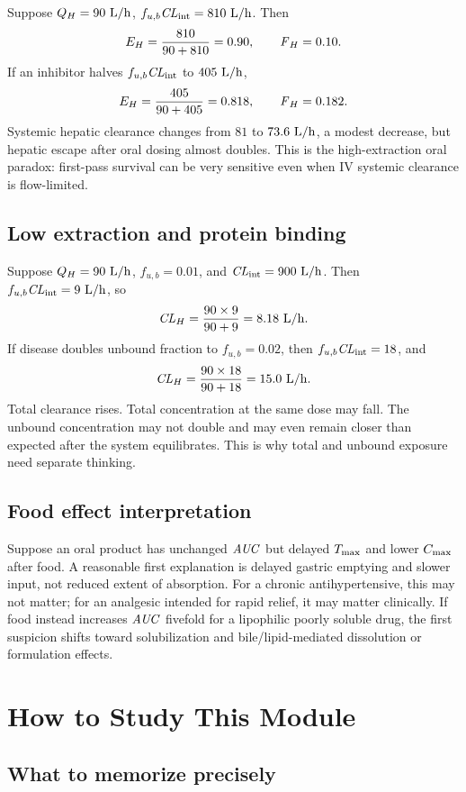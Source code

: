 \documentclass[a4paper]{article}
\newcommand{\CLH}{\ensuremath{\pksym{CL}_{H}}}
\newcommand{\CLint}{\ensuremath{\pksym{CL}_{\pklab{int}}}}
\newcommand{\AUC}{\ensuremath{\pksym{AUC}}}
\newcommand{\Cmax}{\ensuremath{C_{\pklab{max}}}}
\newcommand{\Tmax}{\ensuremath{T_{\pklab{max}}}}
\newcommand{\Fh}{\ensuremath{\pksym{F}_H}}
\newcommand{\fub}{\ensuremath{f_{u,b}}}
\newcommand{\EH}{\ensuremath{E_H}}
\newcommand{\Qh}{\ensuremath{Q_H}}
\begin{document}
Suppose \(\Qh=90\ \pklab{L/h}\), \(\fub\CLint=810\ \pklab{L/h}\). Then
\[
  \EH=\frac{810}{90+810}=0.90,
  \qquad
  \Fh=0.10.
\]
If an inhibitor halves \(\fub\CLint\) to \(405\ \mathrm{L/h}\),
\[
  \EH=\frac{405}{90+405}=0.818,
  \qquad
  \Fh=0.182.
\]
Systemic hepatic clearance changes from \(81\) to \(73.6\ \mathrm{L/h}\), a modest decrease, but hepatic escape after oral dosing almost doubles. This is the high-extraction oral paradox: first-pass survival can be very sensitive even when IV systemic clearance is flow-limited.

\subsection{Low extraction and protein binding}

Suppose \(\Qh=90\ \pklab{L/h}\), \(\fub=0.01\), and \(\CLint=900\ \pklab{L/h}\). Then \(\fub\CLint=9\ \pklab{L/h}\), so
\[
  \CLH=\frac{90\times9}{90+9}=8.18\ \pklab{L/h}.
\]
If disease doubles unbound fraction to \(\fub=0.02\), then \(\fub\CLint=18\), and
\[
  \CLH=\frac{90\times18}{90+18}=15.0\ \pklab{L/h}.
\]
Total clearance rises. Total concentration at the same dose may fall. The unbound concentration may not double and may even remain closer than expected after the system equilibrates. This is why total and unbound exposure need separate thinking.

\subsection{Food effect interpretation}

Suppose an oral product has unchanged \(\AUC\) but delayed \(\Tmax\) and lower \(\Cmax\) after food. A reasonable first explanation is delayed gastric emptying and slower input, not reduced extent of absorption. For a chronic antihypertensive, this may not matter; for an analgesic intended for rapid relief, it may matter clinically. If food instead increases \(\AUC\) fivefold for a lipophilic poorly soluble drug, the first suspicion shifts toward solubilization and bile/lipid-mediated dissolution or formulation effects.

\section{How to Study This Module}

\subsection{What to memorize precisely}
\end{document}
